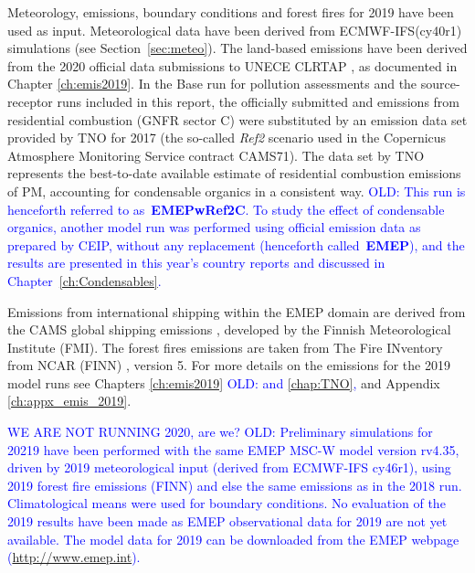  Meteorology, emissions, boundary conditions and forest fires for 2019 have been
 used as input. Meteorological data have been
 derived from ECMWF-IFS(cy40r1) simulations (see Section~\ref{sec:meteo}). The
 land-based emissions have been derived from the 2020 official data
 submissions to UNECE CLRTAP \citep{CEIP2020}, as documented in
 Chapter \ref{ch:emis2019}. In the Base run for pollution assessments and the source-receptor runs included in this report, the officially submitted \PM[10] and \PM[2.5] emissions from residential combustion (GNFR sector C) were substituted by an emission data set provided by TNO for 2017 (the so-called \textit{Ref2} scenario used in the Copernicus Atmosphere Monitoring Service contract CAMS71). The data set by TNO represents the best-to-date available estimate of residential combustion emissions of PM, accounting for condensable organics in a consistent way. \textcolor{blue}{OLD: This run is henceforth referred to as~\textbf{EMEPwRef2C}. To study the effect of condensable organics, another model run was performed using official emission data as prepared by CEIP, without any replacement (henceforth called~\textbf{EMEP}), and the results are presented in this year's country reports \citep{Klein:2020} and discussed in Chapter~\ref{ch:Condensables}. }
 
 Emissions from international shipping
 within the EMEP domain are derived from the CAMS global shipping
 emissions \citep{CAMSemis2019}, developed by the Finnish
 Meteorological Institute (FMI). The forest fires emissions are taken from
 The Fire INventory from NCAR (FINN) \citep{FINNIGAN1990}, version 5.
 For more details on the emissions for the 2019 model runs see Chapters
 \ref{ch:emis2019} \textcolor{blue}{OLD: and \ref{chap:TNO},} and Appendix \ref{ch:appx_emis_2019}.

 \textcolor{blue}{WE ARE NOT RUNNING 2020, are we? OLD: Preliminary simulations for 20219 have been performed with the same
 EMEP MSC-W model version rv4.35, driven by 2019 meteorological
 input (derived from ECMWF-IFS cy46r1), using 2019 forest fire emissions (FINN)
 and else the same emissions as in the 2018 run. Climatological
 means were used for boundary conditions. No evaluation of the 2019
 results have been made as EMEP observational data for 2019 are not yet
 available. The model data for 2019 can be downloaded from the EMEP
 webpage (\url{http://www.emep.int}). }

